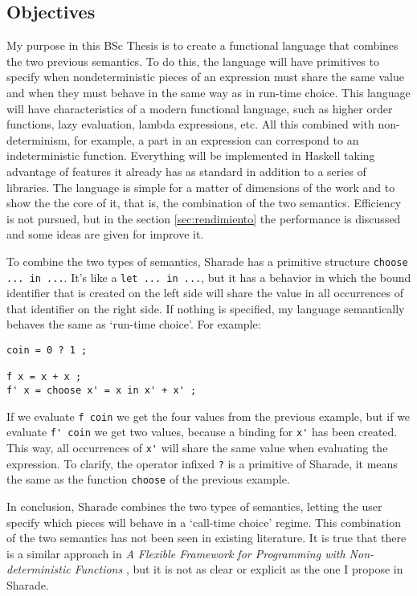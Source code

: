 \documentclass[class=article, crop=false]{standalone}
\begin{document}
\subsection{Objectives}
My purpose in this BSc Thesis is to create a functional language that combines the
two previous semantics. To do this, the language will have primitives to specify when
nondeterministic pieces of an expression must share the same value and when they must
behave in the same way as in run-time choice. This language will have characteristics of a
modern functional language, such as higher order functions, lazy evaluation, lambda
expressions, etc. All this combined with non-determinism, for example, a part in an
expression can correspond to an indeterministic function. Everything will be implemented in
Haskell taking advantage of features it already has as standard in addition to a series of
libraries. The language is simple for a matter of dimensions of the work and to show the the
core of it, that is, the combination of the two semantics. Efficiency is not pursued, but in
the section \ref{sec:rendimiento} the performance is discussed and some ideas are given for
improve it.

To combine the two types of semantics, Sharade has a primitive structure
\verb`choose ... in ...`. It's like a \verb`let ... in ...`, but it has a behavior in which
the bound identifier that is created on the left side will share the value in all occurrences
of that identifier on the right side. If nothing is specified, my language semantically
behaves the same as `run-time choice'. For example:

\begin{verbatim}
coin = 0 ? 1 ;

f x = x + x ;
f' x = choose x' = x in x' + x' ;
\end{verbatim}

If we evaluate \verb`f coin` we get the four values from the previous example, but if we
evaluate \verb`f' coin` we get two values, because a binding for \verb`x'` has been created.
This way, all occurrences of \verb`x'` will share the same value when evaluating the
expression. To clarify, the operator infixed \verb`?` is a primitive of Sharade, it means the
same as the function \verb`choose` of the previous example.

In conclusion, Sharade combines the two types of semantics, letting the user specify which
pieces will behave in a `call-time choice' regime. This combination of the two semantics
has not been seen in existing literature. It is true that there is a similar approach in
\textit{A Flexible Framework for Programming with Non-deterministic Functions}
\cite{lopez2009flexible}, but it is not as clear or explicit as the one I
propose in Sharade.
\end{document}
